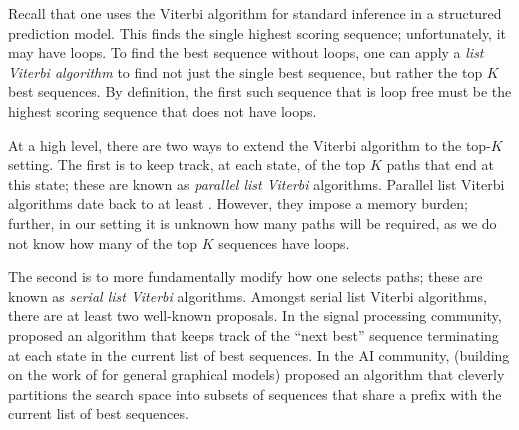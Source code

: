 

Recall that one uses the Viterbi algorithm for standard inference in a structured prediction model.
This finds the single highest scoring sequence; unfortunately, it may have loops.
To find the best sequence without loops, one can apply a \emph{list Viterbi algorithm}
to find not just the single best sequence,
but rather the top $K$ best sequences.
By definition, the first such sequence that is loop free must be the highest scoring sequence that does not have loops.

%

At a high level, there are two ways to extend the Viterbi algorithm to the top-$K$ setting.
The first is to keep track, at each state, of the top $K$ paths that end at this state; these are known as \emph{parallel list Viterbi} algorithms.
Parallel list Viterbi algorithms date back to at least \citet{Forney:1973}.
However, they impose a memory burden; further, in our setting it is unknown how many paths will be required, as we do not know how many of the top $K$ sequences have loops.

The second is to more fundamentally modify how one selects paths; these are known as \emph{serial list Viterbi} algorithms.
Amongst serial list Viterbi algorithms, there are at least two well-known proposals.
In the signal processing community, \citet{seshadri1994list} proposed an algorithm that keeps track of the ``next best'' sequence terminating at each state in the current list of best sequences.
In the AI community, \citet{nilsson2001sequentially} (building on the work of \citet{Nilsson:1998} for general graphical models) proposed an algorithm that cleverly partitions the search space into subsets of sequences that share a prefix with the current list of best sequences.

